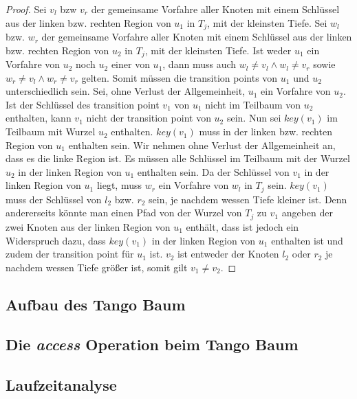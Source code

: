 \documentclass[a4paper,12pt]{article}
\begin{document}
\begin{proof}
 Sei $v_l$ bzw $v_r$ der gemeinsame Vorfahre aller Knoten mit einem Schlüssel aus der linken bzw. rechten Region von $u_1$ in $T_j$, mit der kleinsten Tiefe.  Sei $w_l$ bzw. $w_r$ der gemeinsame Vorfahre aller Knoten mit einem Schlüssel aus der linken bzw. rechten Region von $u_2$ in $T_j$, mit der kleinsten Tiefe. Ist weder $u_1$ ein Vorfahre von $u_2$ noch $u_2$ einer von $u_1$, dann muss auch $w_l \ne v_l \land w_l \ne v_r$ sowie $w_r \ne v_l \land w_r \ne v_r$ gelten. Somit müssen die transition points von $u_1$ und $u_2$ unterschiedlich sein. Sei, ohne Verlust der Allgemeinheit, $u_1$ ein Vorfahre von $u_2$. Ist der Schlüssel des transition point $v_1$ von $u_1$ nicht im Teilbaum von $u_2$ enthalten, kann $v_1$ nicht der transition point von $u_2$ sein. Nun sei $\mathit{key}\left(v_1\right)$ im Teilbaum mit Wurzel $u_2$ enthalten. $\mathit{key}\left(v_1\right)$ muss in der linken bzw. rechten Region von $u_1$ enthalten sein. Wir nehmen ohne Verlust der Allgemeinheit an, dass es die linke Region ist. Es müssen alle Schlüssel im Teilbaum mit der Wurzel $u_2$ in der linken Region von $u_1$ enthalten sein. Da der Schlüssel von $v_1$ in der linken Region von $u_1$ liegt, muss $w_r$ ein Vorfahre von $w_l$ in $T_j$ sein. $\mathit{key}\left(v_1\right)$ muss der Schlüssel von $l_2$ bzw. $r_2$ sein, je nachdem wessen Tiefe kleiner ist. Denn andererseits könnte man einen Pfad von der Wurzel von $T_j$ zu $v_1$ angeben der zwei Knoten aus der linken Region von $u_1$ enthält, dass ist jedoch ein Widerspruch dazu, dass  $\mathit{key}\left(v_1\right)$ in der linken Region von $u_1$ enthalten ist und zudem der transition point für $u_1$ ist. $v_2$ ist entweder der Knoten $l_2$ oder $r_2$ je nachdem wessen Tiefe größer ist, somit gilt $v_1 \ne v_2$.

\end{proof}
















\subsection{Aufbau des Tango Baum} \label{aufbauDesTango}
\subsection{Die \textit{access} Operation beim Tango Baum}
\subsection{Laufzeitanalyse}
\newpage


\end{document}

